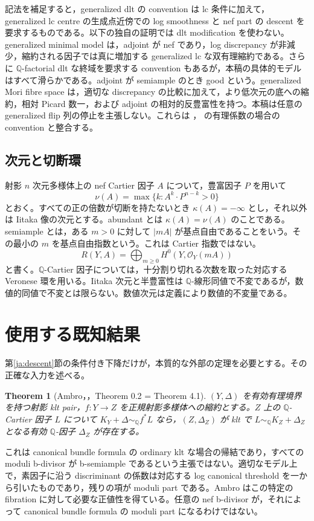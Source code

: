 \documentclass[12pt]{amsart}
\newtheorem{thm}{Theorem}[section]
\theoremstyle{definition}
\theoremstyle{remark}
\numberwithin{equation}{section}
\newcommand{\cO}{\mathcal{O}}
\newcommand{\Q}{\mathbb{Q}}
\newcommand{\qs}{\sim_{\mathbb Q}}
\begin{document}
記法を補足すると，generalized dlt の convention は lc 条件に加えて，generalized lc centre の生成点近傍での log smoothness と nef part の descent を要求するものである。以下の独自の証明では dlt modification を使わない。generalized minimal model は，adjoint が nef であり，log discrepancy が非減少，縮約される因子では真に増加する generalized lc な双有理縮約である。さらに $\Q$-factorial dlt な終域を要求する convention もあるが，本稿の具体的モデルはすべて滑らかである。adjoint が semiample のとき good という。generalized Mori fibre space は，適切な discrepancy の比較に加えて，より低次元の底への縮約，相対 Picard 数一，および adjoint の相対的反豊富性を持つ。本稿は任意の generalized flip 列の停止を主張しない。これらは \cite[\S2]{ja-HL}，\cite[\S2]{ja-TX} の有理係数の場合の convention と整合する。

\subsection{次元と切断環}
射影 $n$ 次元多様体上の nef Cartier 因子 $A$ について，豊富因子 $P$ を用いて
\[
 \nu(A)=\max\{k:A^k\cdot P^{n-k}>0\}
\]
とおく。すべての正の倍数が切断を持たないとき $\kappa(A)=-\infty$ とし，それ以外は Iitaka 像の次元とする。abundant とは $\kappa(A)=\nu(A)$ のことである。semiample とは，ある $m>0$ に対して $|mA|$ が基点自由であることをいう。その最小の $m$ を基点自由指数という。これは Cartier 指数ではない。
\[
 R(Y,A)=\bigoplus_{m\geq0}H^0(Y,\cO_Y(mA))
\]
と書く。$\Q$-Cartier 因子については，十分割り切れる次数を取った対応する Veronese 環を用いる。Iitaka 次元と半豊富性は $\Q$-線形同値で不変であるが，数値的同値で不変とは限らない。数値次元は定義により数値的不変量である。

\section{使用する既知結果}\label{ja:known}
第\ref{ja:descent}節の条件付き下降だけが，本質的な外部の定理を必要とする。その正確な入力を述べる。

\begin{thm}[Ambro，\cite{ja-Amb}，Theorem 0.2 = Theorem 4.1]\label{ja:ambro}
$(Y,\Delta)$ を有効有理境界を持つ射影 klt pair，$f:Y\to Z$ を正規射影多様体への縮約とする。$Z$ 上の $\Q$-Cartier 因子 $L$ について $K_Y+\Delta\qs f^*L$ なら，$(Z,\Delta_Z)$ が klt で $L\qs K_Z+\Delta_Z$ となる有効 $\Q$-因子 $\Delta_Z$ が存在する。
\end{thm}
これは canonical bundle formula の ordinary klt な場合の帰結であり，すべての moduli b-divisor が b-semiample であるという主張ではない。適切なモデル上で，素因子に沿う discriminant の係数は対応する log canonical threshold を一から引いたものであり，残りの項が moduli part である。Ambro はこの特定の fibration に対して必要な正値性を得ている。任意の nef b-divisor が，それによって canonical bundle formula の moduli part になるわけではない。
\end{document}
